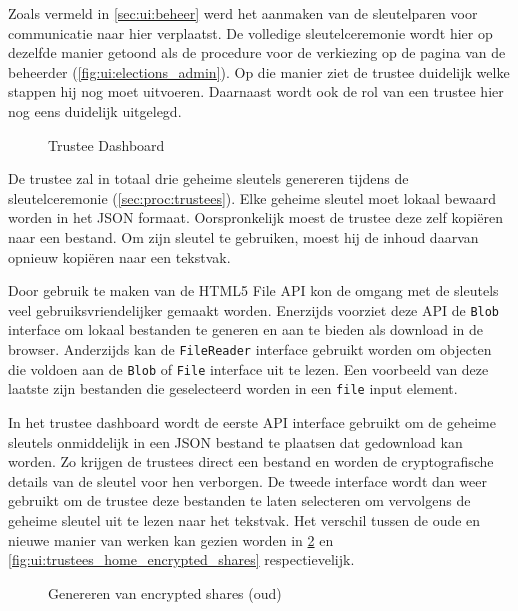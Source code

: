 \npar Zoals vermeld in \ref{sec:ui:beheer} werd het aanmaken van de sleutelparen voor communicatie naar hier verplaatst. De volledige sleutelceremonie wordt hier op dezelfde manier getoond als de procedure voor de verkiezing op de pagina van de beheerder (\ref{fig:ui:elections_admin}). Op die manier ziet de trustee duidelijk welke stappen hij nog moet uitvoeren. Daarnaast wordt ook de rol van een trustee hier nog eens duidelijk uitgelegd.

\begin{figure}
  \caption{Trustee Dashboard}
  \label{fig:ui:trustees_home}
\end{figure}


\npar De trustee zal in totaal drie geheime sleutels genereren tijdens de sleutelceremonie (\ref{sec:proc:trustees}). Elke geheime sleutel moet lokaal bewaard worden in het JSON formaat. Oorspronkelijk moest de trustee deze zelf kopi\"eren naar een bestand. Om zijn sleutel te gebruiken, moest hij de inhoud daarvan opnieuw kopi\"eren naar een tekstvak.

\npar Door gebruik te maken van de HTML5 File API kon de omgang met de sleutels veel gebruiksvriendelijker gemaakt worden.\cite{ranganathan_sicking_file_api} Enerzijds voorziet deze API de \texttt{Blob} interface om lokaal bestanden te generen en aan te bieden als download in de browser. Anderzijds kan de \texttt{FileReader} interface gebruikt worden om objecten die voldoen aan de \texttt{Blob} of \texttt{File} interface uit te lezen. Een voorbeeld van deze laatste zijn bestanden die geselecteerd worden in een \texttt{file} input element.

\npar In het trustee dashboard wordt de eerste API interface gebruikt om de geheime sleutels onmiddelijk in een JSON bestand te plaatsen dat gedownload kan worden. Zo krijgen de trustees direct een bestand en worden de cryptografische details van de sleutel voor hen verborgen. De tweede interface wordt dan weer gebruikt om de trustee deze bestanden te laten selecteren om vervolgens de geheime sleutel uit te lezen naar het tekstvak. Het verschil tussen de oude en nieuwe manier van werken kan gezien worden in \ref{fig:ui:trustees_home_encrypted_shares_old} en \ref{fig:ui:trustees_home_encrypted_shares} respectievelijk.

\begin{figure}
  \caption{Genereren van encrypted shares (oud)}
  \label{fig:ui:trustees_home_encrypted_shares_old}
\end{figure}

